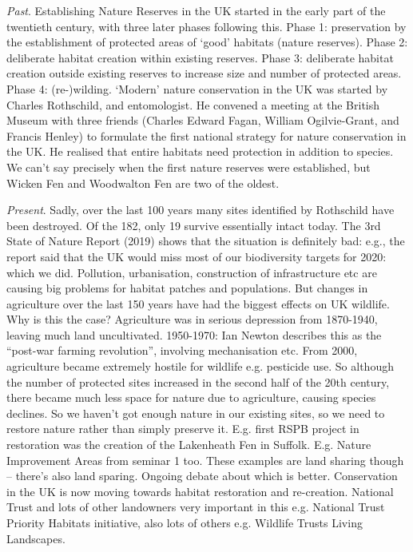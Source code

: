 \documentclass[9pt]{article}
\begin{document}
	
	\textit{Past}. Establishing Nature Reserves in the UK started in the early part of the twentieth century, with three later phases following this. Phase 1: preservation by the establishment of protected areas of ‘good’ habitats (nature reserves). Phase 2: deliberate habitat creation within existing reserves. Phase 3: deliberate habitat creation outside existing reserves to increase size and number of protected areas. Phase 4: (re-)wilding. ‘Modern’ nature conservation in the UK was started by Charles Rothschild, and entomologist. He convened a meeting at the British Museum with three friends (Charles Edward Fagan, William Ogilvie-Grant, and Francis Henley) to formulate the first national strategy for nature conservation in the UK. He realised that entire habitats need protection in addition to species. We can’t say precisely when the first nature reserves were established, but Wicken Fen and Woodwalton Fen are two of the oldest. 
	
	\textit{Present}. Sadly, over the last 100 years many sites identified by Rothschild have been destroyed. Of the 182, only 19 survive essentially intact today. The 3rd State of Nature Report (2019) shows that the situation is definitely bad: e.g., the report said that the UK would miss most of our biodiversity targets for 2020: which we did. Pollution, urbanisation, construction of infrastructure etc are causing big problems for habitat patches and populations. But changes in agriculture over the last 150 years have had the biggest effects on UK wildlife. Why is this the case? Agriculture was in serious depression from 1870-1940, leaving much land uncultivated. 1950-1970: Ian Newton describes this as the “post-war farming revolution”, involving mechanisation etc. From 2000, agriculture became extremely hostile for wildlife e.g. pesticide use. So although the number of protected sites increased in the second half of the 20th century, there became much less space for nature due to agriculture, causing species declines. So we haven’t got enough nature in our existing sites, so we need to restore nature rather than simply preserve it. E.g. first RSPB project in restoration was the creation of the Lakenheath Fen in Suffolk. E.g. Nature Improvement Areas from seminar 1 too. These examples are land sharing though – there’s also land sparing. Ongoing debate about which is better. Conservation in the UK is now moving towards habitat restoration and re-creation. National Trust and lots of other landowners very important in this e.g. National Trust Priority Habitats initiative, also lots of others e.g. Wildlife Trusts Living Landscapes. 
	
\end{document}
